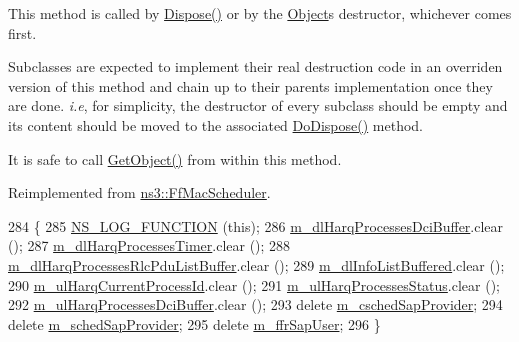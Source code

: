 This method is called by \hyperlink{classns3_1_1Object_aa90ae598863f6c251cdab3c3722afdaf}{Dispose()} or by the \hyperlink{classns3_1_1Object}{Object}\textquotesingle{}s destructor, whichever comes first.

Subclasses are expected to implement their real destruction code in an overriden version of this method and chain up to their parent\textquotesingle{}s implementation once they are done. {\itshape i.\+e}, for simplicity, the destructor of every subclass should be empty and its content should be moved to the associated \hyperlink{classns3_1_1CqaFfMacScheduler_af41d8f0979c15b4766c2e1ac955ab0b9}{Do\+Dispose()} method.

It is safe to call \hyperlink{classns3_1_1Object_a13e18c00017096c8381eb651d5bd0783}{Get\+Object()} from within this method. 

Reimplemented from \hyperlink{classns3_1_1FfMacScheduler_a771411e455992b81d8399681779debd9}{ns3\+::\+Ff\+Mac\+Scheduler}.


\begin{DoxyCode}
284 \{
285   \hyperlink{log-macros-disabled_8h_a90b90d5bad1f39cb1b64923ea94c0761}{NS\_LOG\_FUNCTION} (\textcolor{keyword}{this});
286   \hyperlink{classns3_1_1CqaFfMacScheduler_a4de0e4833545b31fcb31f77492a34380}{m\_dlHarqProcessesDciBuffer}.clear ();
287   \hyperlink{classns3_1_1CqaFfMacScheduler_a2e130ab374b4770c3544495ba593f023}{m\_dlHarqProcessesTimer}.clear ();
288   \hyperlink{classns3_1_1CqaFfMacScheduler_a019cbb20e91d699a8c7e26fb8d69ff4e}{m\_dlHarqProcessesRlcPduListBuffer}.clear ();
289   \hyperlink{classns3_1_1CqaFfMacScheduler_aabc929a8c1c30338a5fa0826bb7cd2b8}{m\_dlInfoListBuffered}.clear ();
290   \hyperlink{classns3_1_1CqaFfMacScheduler_a55974c35f8b783bb902ae8676fb6ff10}{m\_ulHarqCurrentProcessId}.clear ();
291   \hyperlink{classns3_1_1CqaFfMacScheduler_a6dd8ea014c55132578f7c050e726f856}{m\_ulHarqProcessesStatus}.clear ();
292   \hyperlink{classns3_1_1CqaFfMacScheduler_a9af9c203c1b5fc43336988caf2294562}{m\_ulHarqProcessesDciBuffer}.clear ();
293   \textcolor{keyword}{delete} \hyperlink{classns3_1_1CqaFfMacScheduler_a04e8005367e22a36fb264a71382c2ac1}{m\_cschedSapProvider};
294   \textcolor{keyword}{delete} \hyperlink{classns3_1_1CqaFfMacScheduler_ac139d5e64c1bdd47b31e3f8ae1633ebc}{m\_schedSapProvider};
295   \textcolor{keyword}{delete} \hyperlink{classns3_1_1CqaFfMacScheduler_a68b05ba68f164a5acf308ce7dd18e57c}{m\_ffrSapUser};
296 \}
\end{DoxyCode}
